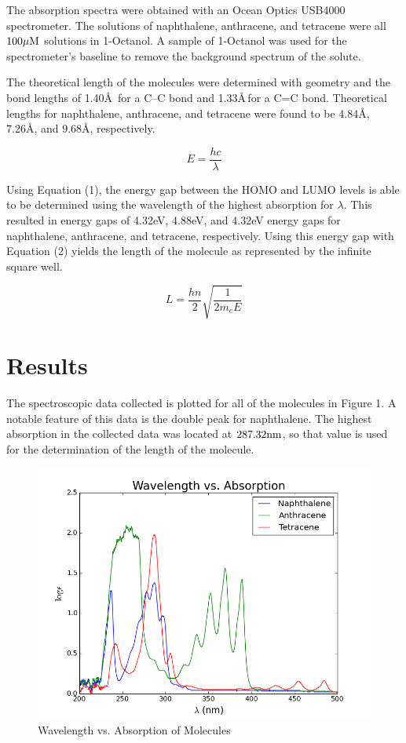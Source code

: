 \documentclass[10pt,a4paper]{article}
\begin{document}
The absorption spectra were obtained with an Ocean Optics USB4000 spectrometer. The solutions of naphthalene, anthracene, and tetracene were all $100 \mu \rm{M}$ solutions in 1-Octanol. A sample of 1-Octanol was used for the spectrometer's baseline to remove the background spectrum of the solute.

The theoretical length of the molecules were determined with geometry and the bond lengths of 1.40\AA\, for a C--C bond and 1.33\AA \,for a C=C bond. Theoretical lengths for naphthalene, anthracene, and tetracene were found to be 4.84\AA, 7.26\AA, and 9.68\AA, respectively.

\begin{equation}
E = \frac{hc}{\lambda}
\end{equation}

Using Equation (1), the energy gap between the HOMO and LUMO levels is able to be determined using the wavelength of the highest absorption for $\lambda$. This resulted in energy gaps of 4.32eV, 4.88eV, and 4.32eV energy gaps for naphthalene, anthracene, and tetracene, respectively. Using this energy gap with Equation (2) yields the length of the molecule as represented by the infinite square well.

\begin{equation}
L = \frac{hn}{2} \sqrt{\frac{1}{2 m_e E}}
\end{equation}

\section*{Results}

The spectroscopic data collected is plotted for all of the molecules in Figure 1. A notable feature of this data is the double peak for naphthalene. The highest absorption in the collected data was located at $287.32\rm{nm}$, so that value is used for the determination of the length of the molecule.

\begin{figure}[h]
\includegraphics[width=\linewidth]{plot.png}
\caption{Wavelength vs. Absorption of Molecules}
\end{figure}
\end{document}
